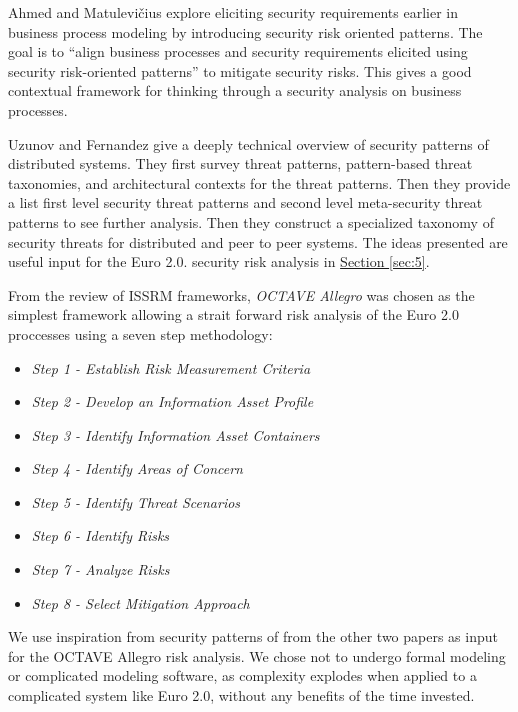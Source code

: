 \documentclass[a4paper,12pt]{article} %
\newcommand{\hypersectionref}[1]{\hyperref[#1]{Section \ref{#1}}}
\begin{document}
Ahmed and Matulevi\v{c}ius explore eliciting security requirements earlier in business process modeling by introducing security risk oriented patterns\cite{Ahmed:2014:SBP:2588915.2589308}. The goal is to ``align business processes and security requirements elicited using security risk-oriented patterns'' to mitigate security risks. This gives a good contextual framework for thinking through a security analysis on business processes.

Uzunov and Fernandez give a deeply technical overview of security patterns of distributed systems\cite{Uzunov:2014:EPL:2588915.2589309}. They first survey threat patterns, pattern-based threat taxonomies, and architectural contexts for the threat patterns. Then they provide a list first level security threat patterns and second level meta-security threat patterns to see further analysis. Then they construct a specialized taxonomy of security threats for distributed and peer to peer systems. The ideas presented are useful input for the Euro 2.0. security risk analysis in \hypersectionref{sec:5}.

From the review of ISSRM frameworks, \textit{OCTAVE Allegro} was chosen as the simplest framework allowing a strait forward risk analysis of the Euro 2.0 proccesses using a seven step methodology\cite{CaralliIntroducingOCTAVE2007}:

\begin{itemize}
	\item \textit{Step 1 - Establish Risk Measurement Criteria}
	\item \textit{Step 2 - Develop an Information Asset Profile}
	\item \textit{Step 3 - Identify Information Asset Containers}
	\item \textit{Step 4 - Identify Areas of Concern}
	\item \textit{Step 5 - Identify Threat Scenarios}
	\item \textit{Step 6 - Identify Risks}
	\item \textit{Step 7 - Analyze Risks}
	\item \textit{Step 8 - Select Mitigation Approach}
\end{itemize}

We use inspiration from security patterns of from the other two papers as input for the OCTAVE Allegro risk analysis. We chose not to undergo formal modeling or complicated modeling software, as complexity explodes when applied to a complicated system like Euro 2.0, without any benefits of the time invested.
\end{document}
